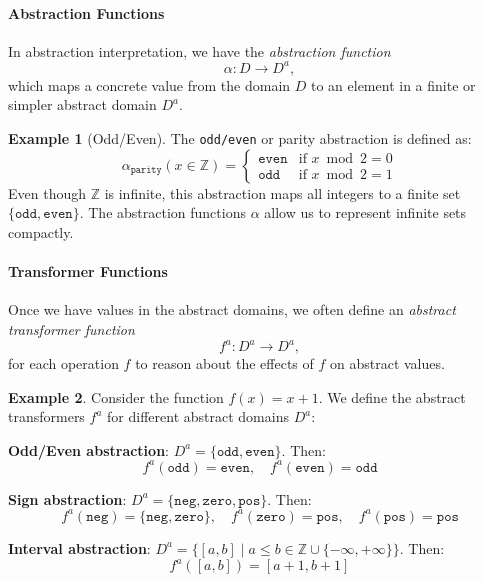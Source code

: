 \documentclass[oneside,11pt,dvipsnames]{book}
\numberwithin{equation}{section}
\theoremstyle{definition}
\newtheorem{example}{Example}[section]
\theoremstyle{remark}
\begin{document}
\paragraph{Abstraction Functions} In abstraction interpretation, we have the \emph{abstraction function}
\[
\alpha : D \to D^a,
\]
which maps a concrete value from the domain $D$ to an element in a finite or simpler abstract domain $D^a$. 

\begin{example}[Odd/Even]
    The \texttt{odd/even} or parity abstraction is defined as:
\[
\alpha_{\texttt{parity}}(x \in \mathbb{Z}) =
\begin{cases}
\texttt{even} & \text{if } x \bmod 2 = 0 \\
\texttt{odd}  & \text{if } x \bmod 2 = 1
\end{cases}
\]
Even though $\mathbb{Z}$ is infinite, this abstraction maps all integers to a finite set $\{\texttt{odd}, \texttt{even}\}$. The abstraction functions $\alpha$ allow us to represent infinite sets compactly.
\end{example}

\paragraph{Transformer Functions} Once we have values in the abstract domains, we often define an \emph{abstract transformer function} 
\[
f^a : D^a \to D^a,
\]
for each operation \(f\) to reason about the effects of \(f\) on abstract values.


\begin{example}
 Consider the function $f(x) = x + 1$. We define the abstract transformers $f^a$ for different abstract domains $D^a$:

\textbf{Odd/Even abstraction}:  $D^a = \{\texttt{odd}, \texttt{even}\}$. Then:
\[
f^a(\texttt{odd}) = \texttt{even}, \quad
f^a(\texttt{even}) = \texttt{odd}
\]

\textbf{Sign abstraction}: $D^a = \{\texttt{neg}, \texttt{zero}, \texttt{pos}\}$. Then: 
\[
f^a(\texttt{neg}) = \{\texttt{neg}, \texttt{zero}\}, \quad
f^a(\texttt{zero}) = \texttt{pos}, \quad
f^a(\texttt{pos}) = \texttt{pos}
\]


\textbf{Interval abstraction}: $D^a = \{ [a, b] \mid a \leq b \in \mathbb{Z} \cup \{-\infty, +\infty\} \}$. Then:
\[
f^a([a, b]) = [a+1, b+1]
\]



\end{example}
\end{document}
